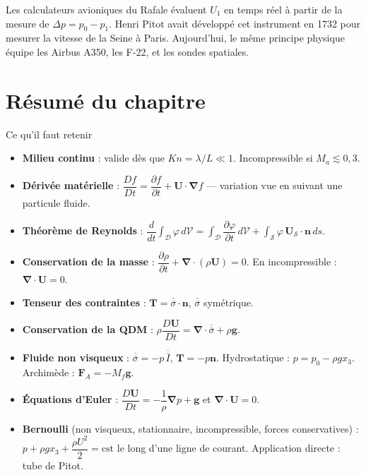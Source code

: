 \documentclass[11pt,a4paper]{report}
\newcommand{\ten}[1]{\overline{\overline{#1}}}   %
\begin{document}
Les calculateurs avioniques du Rafale évaluent $U_1$ en temps réel à partir de
la mesure de $\Delta p = p_0 - p_1$. Henri Pitot avait développé cet instrument
en 1732 pour mesurer la vitesse de la Seine à Paris. Aujourd'hui, le même principe
physique équipe les Airbus A350, les F-22, et les sondes spatiales.

\section*{Résumé du chapitre}

\begin{importantbox}{Ce qu'il faut retenir}
\begin{itemize}
    \item \textbf{Milieu continu} : valide dès que $Kn = \lambda/L \ll 1$.
    Incompressible si $M_a \lesssim 0{,}3$.

    \item \textbf{Dérivée matérielle} :
    $\dfrac{Df}{Dt} = \dfrac{\partial f}{\partial t} + \bm{U}\cdot\boldsymbol{\nabla}f$
    --- variation vue en suivant une particule fluide.

    \item \textbf{Théorème de Reynolds} :
    $\dfrac{d}{dt}\displaystyle\int_\mathcal{D}\varphi\,d\mathcal{V}
    = \displaystyle\int_\mathcal{D}\dfrac{\partial\varphi}{\partial t}\,d\mathcal{V}
    + \displaystyle\int_\mathcal{S}\varphi\,\bm{U}_\mathcal{S}\cdot\bm{n}\,ds$.

    \item \textbf{Conservation de la masse} :
    $\dfrac{\partial\rho}{\partial t} + \boldsymbol{\nabla}\cdot(\rho\bm{U}) = 0$.
    En incompressible : $\boldsymbol{\nabla}\cdot\bm{U} = 0$.

    \item \textbf{Tenseur des contraintes} : $\bm{T} = \ten{\sigma}\cdot\bm{n}$,
    $\ten{\sigma}$ symétrique.

    \item \textbf{Conservation de la QDM} :
    $\rho\dfrac{D\bm{U}}{Dt} = \boldsymbol{\nabla}\cdot\ten{\sigma} + \rho\bm{g}$.

    \item \textbf{Fluide non visqueux} :
    $\ten{\sigma} = -p\,\ten{I}$, $\bm{T} = -p\bm{n}$.
    Hydrostatique : $p = p_0 - \rho g x_3$.
    Archimède : $\bm{F}_A = -M_f\bm{g}$.

    \item \textbf{Équations d'Euler} :
    $\dfrac{D\bm{U}}{Dt} = -\dfrac{1}{\rho}\boldsymbol{\nabla}p + \bm{g}$
    et $\boldsymbol{\nabla}\cdot\bm{U} = 0$.

    \item \textbf{Bernoulli} (non visqueux, stationnaire, incompressible,
    forces conservatives) :
    $p + \rho g x_3 + \dfrac{\rho U^2}{2} = \text{cst}$ le long d'une ligne
    de courant. Application directe : tube de Pitot.
\end{itemize}
\end{importantbox}
\end{document}
